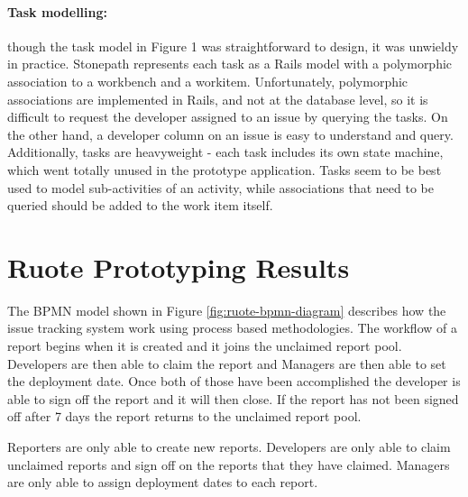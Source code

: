 \documentclass[document.tex]{subfiles}
\begin{document}
\paragraph{Task modelling:} though the task model in Figure 1 was straightforward to design, it was unwieldy in practice. Stonepath represents each task as a Rails model with a polymorphic association to a workbench and a workitem. Unfortunately, polymorphic associations are implemented in Rails, and not at the database level, so it is difficult to request the developer assigned to an issue by querying the tasks. On the other hand, a developer column on an issue is easy to understand and query. Additionally, tasks are heavyweight - each task includes its own state machine, which went totally unused in the prototype application. Tasks seem to be best used to model sub-activities of an activity, while associations that need to be queried should be added to the work item itself.


\FloatBarrier

\section {Ruote Prototyping Results}
\label {sec:ruote-prototyping-results}

The BPMN model shown in Figure \ref{fig:ruote-bpmn-diagram} describes how the issue tracking system work using process based methodologies. The workflow of a report begins when it is created and it joins the unclaimed report pool. Developers are then able to claim the report and Managers are then able to set the deployment date. Once both of those have been accomplished the developer is able to sign off the report and it will then close. If the report has not been signed off after 7 days the report returns to the unclaimed report pool.

Reporters are only able to create new reports. Developers are only able to claim unclaimed reports and sign off on the reports that they have claimed. Managers are only able to assign deployment dates to each report.
\end{document}
